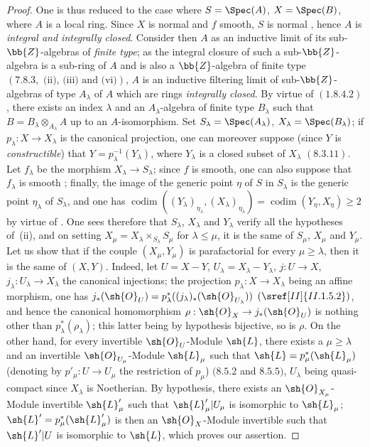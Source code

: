 \begin{proof}
One is thus reduced to the case where $S=\Spec(A)$, $X=\Spec(B)$, where $A$ is a local ring.
Since $X$ is normal and $f$ smooth, $S$ is normal , hence $A$ is \emph{integral and integrally closed}.
Consider then $A$ as an inductive limit of its sub-$\bb{Z}$-algebras of \emph{finite type}; as the integral closure of such a sub-$\bb{Z}$-algebra is a sub-ring of $A$ and is also a $\bb{Z}$-algebra of finite type $(7.8.3,\text{ (ii), (iii) and (vi)})$, $A$ is an inductive filtering limit of sub-$\bb{Z}$-algebras of type $A_\lambda$ of $A$ which are rings \emph{integrally closed}.
By virtue of $(1.8.4.2)$, there exists an index $\lambda$ and an $A_\lambda$-algebra of finite type $B_\lambda$ such that $B=B_\lambda\otimes_{A_\lambda}A$ up to an $A$-isomorphism.
Set $S_\lambda=\Spec(A_\lambda)$, $X_\lambda=\Spec(B_\lambda)$; if $p_\lambda:X\to X_\lambda$ is the canonical projection, one can moreover suppose (since $Y$ is \emph{constructible}) that $Y=p_\lambda^{-1}(Y_\lambda)$, where $Y_\lambda$ is a closed subset of $X_\lambda$ $(8.3.11)$.
Let $f_\lambda$ be the morphism $X_\lambda\to S_\lambda$; since $f$ is smooth, one can also suppose that $f_\lambda$ is smooth ; finally, the image of the generic point $\eta$ of $S$ in $S_\lambda$ is the generic point $\eta_\lambda$ of $S_\lambda$, and one has $\operatorname{codim}((Y_\lambda)_{\eta_\lambda},(X_\lambda)_{\eta_\lambda})=\operatorname{codim}(Y_\eta,X_\eta)\geq 2$ by virtue of .
One sees therefore that $S_\lambda$, $X_\lambda$ and $Y_\lambda$ verify all the hypotheses of~(ii), and on setting $X_\mu=X_\lambda\times_{S_\lambda}S_\mu$ for $\lambda\leq\mu$, it is the same of $S_\mu$, $X_\mu$ and $Y_\mu$.
Let us show that if the couple $(X_\mu,Y_\mu)$ is parafactorial for every $\mu\geq\lambda$, then it is the same of $(X,Y)$.
Indeed, let $U=X-Y$, $U_\lambda=X_\lambda-Y_\lambda$, $j:U\to X$, $j_\lambda:U_\lambda\to X_\lambda$ the canonical injections; the projection $p_\lambda:X\to X_\lambda$ being an affine morphism, one has $j_*(\sh{O}_U)=p_\lambda^*((j_\lambda)_*(\sh{O}_{U_\lambda}))$ $(\sref[II]{II.1.5.2})$, and hence the canonical homomorphism $\rho:\sh{O}_X\to j_*(\sh{O}_U)$ is nothing other than $p_\lambda^*(\rho_\lambda)$; this latter being by hypothesis bijective, so is $\rho$.
On the other hand, for every invertible $\sh{O}_U$-Module $\sh{L}$, there exists a $\mu\geq\lambda$ and an invertible $\sh{O}_{U_\mu}$-Module $\sh{L}_\mu$ such that $\sh{L}=p_\mu^*(\sh{L}_\mu)$ (denoting by $p'_\mu:U\to U_\mu$ the restriction of $p_\mu$) $(8.5.2$ and $8.5.5)$, $U_\lambda$ being quasi-compact since $X_\lambda$ is Noetherian.
By hypothesis, there exists an $\sh{O}_{X_\mu}$-Module invertible $\sh{L}'_\mu$ such that $\sh{L}'_\mu|U_\mu$ is isomorphic to $\sh{L}_\mu$; $\sh{L}'=p_\mu^*(\sh{L}'_\mu)$ is then an $\sh{O}_X$-Module invertible such that $\sh{L}'|U$ is isomorphic to $\sh{L}$, which proves our assertion.


\end{proof}

